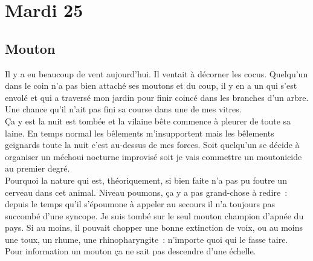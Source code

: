﻿\section{Mardi 25}
\subsection{Mouton}
Il y a eu beaucoup de vent aujourd’hui. Il ventait à décorner les cocus. Quelqu’un dans le coin n’a pas bien attaché ses moutons et du coup, il y en a un qui s’est envolé et qui a traversé mon jardin pour finir coincé dans les branches d’un arbre. Une chance qu’il n’ait pas fini sa course dans une de mes vitres.\\
Ça y est la nuit est tombée et la vilaine bête commence à pleurer de toute sa laine. En temps normal les bêlements m’insupportent mais les bêlements geignards toute la nuit c’est au-dessus de mes forces. Soit quelqu’un se décide à organiser un méchoui nocturne improvisé soit je vais commettre un moutonicide au premier degré. \\
Pourquoi la nature qui est, théoriquement, si bien faite n’a pas pu foutre un cerveau dans cet animal. Niveau poumons, ça y a pas grand-chose à redire : depuis le temps qu’il s’époumone à appeler au secours il n’a toujours pas succombé d’une syncope. Je suis tombé sur le seul mouton champion d’apnée du pays. Si au moins, il pouvait chopper une bonne extinction de voix, ou au moins une toux, un rhume, une rhinopharyngite : n’importe quoi qui le fasse taire. \\
Pour information un mouton ça ne sait pas descendre d’une échelle.
